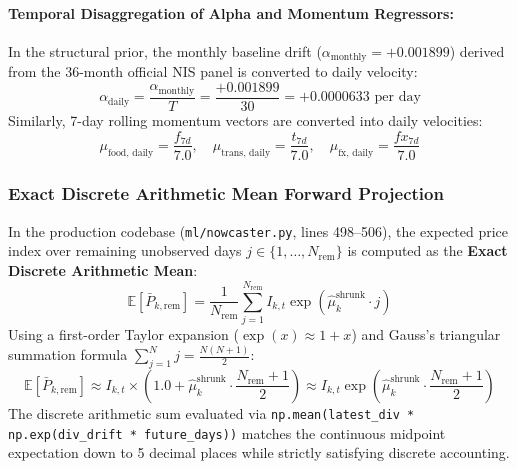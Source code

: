 \documentclass[11pt,a4paper,oneside]{article}
\begin{document}
\paragraph{Temporal Disaggregation of Alpha and Momentum Regressors:}
In the structural prior, the monthly baseline drift ($\alpha_{\text{monthly}} = +0.001899$) derived from the 36-month official NIS panel is converted to daily velocity:
\begin{equation}
\alpha_{\text{daily}} = \frac{\alpha_{\text{monthly}}}{T} = \frac{+0.001899}{30} = +0.0000633 \text{ per day}
\end{equation}
Similarly, 7-day rolling momentum vectors are converted into daily velocities:
\begin{equation}
\mu_{\text{food, daily}} = \frac{f_{7d}}{7.0}, \quad \mu_{\text{trans, daily}} = \frac{t_{7d}}{7.0}, \quad \mu_{\text{fx, daily}} = \frac{fx_{7d}}{7.0}
\end{equation}

\subsubsection{Exact Discrete Arithmetic Mean Forward Projection}
In the production codebase (\texttt{ml/nowcaster.py}, lines 498--506), the expected price index over remaining unobserved days $j \in \{1, \dots, N_{\text{rem}}\}$ is computed as the \textbf{Exact Discrete Arithmetic Mean}:
\begin{equation}
\boxed{\mathbb{E}[\bar{P}_{k, \text{rem}}] = \frac{1}{N_{\text{rem}}} \sum_{j=1}^{N_{\text{rem}}} I_{k, t} \exp\left( \hat{\mu}_k^{\text{shrunk}} \cdot j \right)}
\end{equation}
Using a first-order Taylor expansion ($\exp(x) \approx 1 + x$) and Gauss's triangular summation formula $\sum_{j=1}^N j = \frac{N(N+1)}{2}$:
\begin{equation}
\mathbb{E}[\bar{P}_{k, \text{rem}}] \approx I_{k, t} \times \left( 1.0 + \hat{\mu}_k^{\text{shrunk}} \cdot \frac{N_{\text{rem}} + 1}{2} \right) \approx I_{k, t} \exp\left( \hat{\mu}_k^{\text{shrunk}} \cdot \frac{N_{\text{rem}} + 1}{2} \right)
\end{equation}
The discrete arithmetic sum evaluated via \texttt{np.mean(latest\_div * np.exp(div\_drift * future\_days))} matches the continuous midpoint expectation down to 5 decimal places while strictly satisfying discrete accounting.
\end{document}
